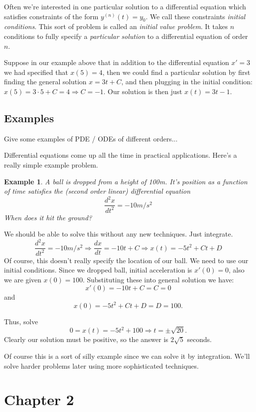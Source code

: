 \documentclass[14pt]{article}
\newtheorem{ex}{Example}
\begin{document}
Often we're interested in one particular solution to a differential equation which satisfies
constraints of the form $y^{(n)}(t) = y_0$. We call these constraints \emph{initial
  conditions}. This sort of problem is called an \emph{initial value problem}. It takes $n$
conditions to fully specify a \emph{particular solution} to a differential equation of order $n$.

Suppose in our example above that in addition to the differential equation $x'=3$ we had specified
that $x(5) = 4$, then we could find a particular solution by first finding the general solution $x =
3t + C$, and then plugging in the initial condition: $x(5) = 3 \cdot 5 + C = 4 \Rightarrow C =
-1$. Our solution is then just $x(t) = 3 t -1 $.


\subsection*{Examples}
Give some examples of PDE / ODEs of different orders...

Differential equations come up all the time in practical applications. Here's a really simple
example problem. 

\begin{ex}
  A ball is dropped from a height of 100m. It's position as a function of time satisfies the (second
  order linear) differential equation
  \[\frac{d^2x}{dt^2} = -10 m/s^2 \]
  When does it hit the ground?
\end{ex}

We should be able to solve this without any new techniques. Just integrate.
  \[\frac{d^2x}{dt^2} = -10 m/s^2 \Rightarrow \frac{dx}{dt} = -10 t + C \Rightarrow x(t) = -5 t^2 +
  C t + D \] Of course, this doesn't really specify the location of our ball. We need to use our
  initial conditions. Since we dropped ball, initial acceleration is $x'(0) = 0$, also we are given
  $x(0) = 100$. Substituting these into general solution we have:
  \[x'(0) = -10 t + C = C = 0\] and
  \[x(0) = -5 t^2 + C t + D = D = 100.\]

Thus, solve
\[0 = x(t) = -5 t^2 + 100 \Rightarrow t = \pm \sqrt{20}.\]
Clearly our solution must be positive, so the answer is $2 \sqrt 5$ seconds.

Of course this is a sort of silly example since we can solve it by integration. We'll solve harder
problems later using more sophisticated techniques.

\section{Chapter 2}
\end{document}
